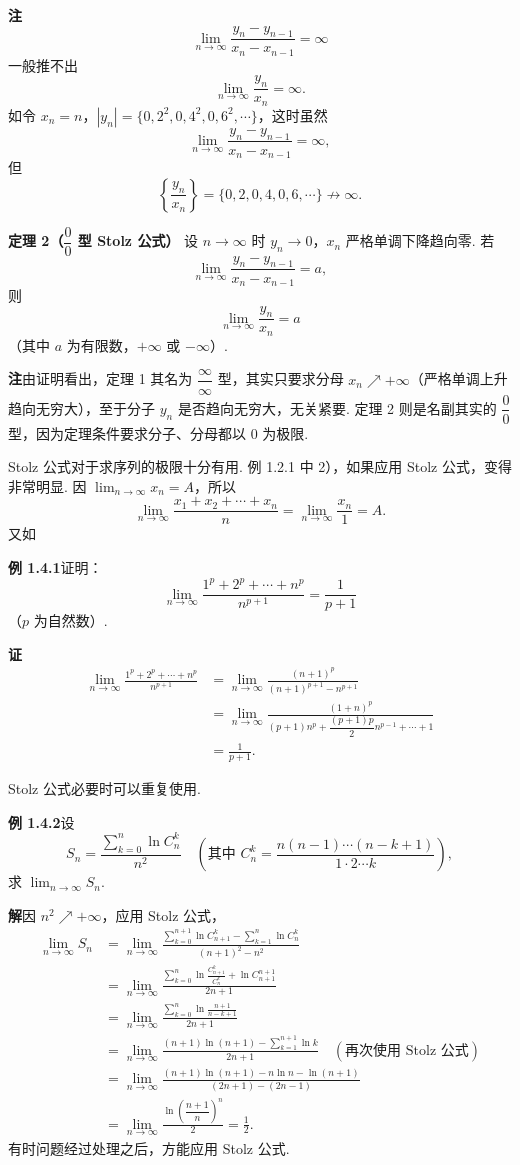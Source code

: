 \documentclass[UTF8,12pt,a4paper,fontset=fandol]{ctexart}
\begin{document}
\noindent\textbf{注}\quad
\[
  \lim_{n\to\infty}\frac{y_n-y_{n-1}}{x_n-x_{n-1}}=\infty
\]
一般推不出
\[
  \lim_{n\to\infty}\frac{y_n}{x_n}=\infty.
\]
如令 $x_n=n$，$|y_n|=\{0,2^2,0,4^2,0,6^2,\cdots\}$，这时虽然
\[
  \lim_{n\to\infty}\frac{y_n-y_{n-1}}{x_n-x_{n-1}}=\infty,
\]
但
\[
  \left\{\frac{y_n}{x_n}\right\}=\{0,2,0,4,0,6,\cdots\}\not\to\infty.
\]

\noindent\textbf{定理 2（$\dfrac00$ 型 Stolz 公式）}\quad
设 $n\to\infty$ 时 $y_n\to0$，$x_n$ 严格单调下降趋向零.
若
\[
  \lim_{n\to\infty}\frac{y_n-y_{n-1}}{x_n-x_{n-1}}=a,
\]
则
\[
  \lim_{n\to\infty}\frac{y_n}{x_n}=a
\]
（其中 $a$ 为有限数，$+\infty$ 或 $-\infty$）.

\noindent\textbf{注}\quad 由证明看出，定理 1 其名为 $\dfrac\infty\infty$ 型，其实只要求分母 $x_n\nearrow+\infty$（严格单调上升趋向无穷大），至于分子 $y_n$ 是否趋向无穷大，无关紧要. 定理 2 则是名副其实的 $\dfrac00$ 型，因为定理条件要求分子、分母都以 0 为极限.

Stolz 公式对于求序列的极限十分有用. 例 1.2.1 中 2），如果应用 Stolz 公式，变得非常明显. 因 $\displaystyle\lim_{n\to\infty}x_n=A$，所以
\[
  \lim_{n\to\infty}\frac{x_1+x_2+\cdots+x_n}{n}
  =\lim_{n\to\infty}\frac{x_n}{1}=A.
\]
又如

\noindent\textbf{例 1.4.1}\quad 证明：
\[
  \lim_{n\to\infty}\frac{1^p+2^p+\cdots+n^p}{n^{p+1}}
  =\frac1{p+1}
\]
（$p$ 为自然数）.

\noindent\textbf{证}\quad
\[
\begin{aligned}
  \lim_{n\to\infty}\frac{1^p+2^p+\cdots+n^p}{n^{p+1}}
  &=\lim_{n\to\infty}\frac{(n+1)^p}{(n+1)^{p+1}-n^{p+1}}\\
  &=\lim_{n\to\infty}
  \frac{(1+n)^p}{(p+1)n^p+\dfrac{(p+1)p}{2}n^{p-1}+\cdots+1}\\
  &=\frac1{p+1}.
\end{aligned}
\]

Stolz 公式必要时可以重复使用.

\noindent\textbf{例 1.4.2}\quad 设
\[
  S_n=\frac{\displaystyle\sum_{k=0}^n\ln C_n^k}{n^2}
  \quad\left(\text{其中 }C_n^k=\frac{n(n-1)\cdots(n-k+1)}{1\cdot2\cdots k}\right),
\]
求 $\displaystyle\lim_{n\to\infty}S_n$.

\noindent\textbf{解}\quad 因 $n^2\nearrow+\infty$，应用 Stolz 公式，
\[
\begin{aligned}
  \lim_{n\to\infty}S_n
  &=\lim_{n\to\infty}
  \frac{\displaystyle\sum_{k=0}^{n+1}\ln C_{n+1}^k-\sum_{k=1}^n\ln C_n^k}{(n+1)^2-n^2}\\
  &=\lim_{n\to\infty}
  \frac{\displaystyle\sum_{k=0}^n\ln\frac{C_{n+1}^k}{C_n^k}+\ln C_{n+1}^{n+1}}{2n+1}\\
  &=\lim_{n\to\infty}
  \frac{\displaystyle\sum_{k=0}^n\ln\frac{n+1}{n-k+1}}{2n+1}\\
  &=\lim_{n\to\infty}
  \frac{(n+1)\ln(n+1)-\displaystyle\sum_{k=1}^{n+1}\ln k}{2n+1}
  \quad(\text{再次使用 Stolz 公式})\\
  &=\lim_{n\to\infty}
  \frac{(n+1)\ln(n+1)-n\ln n-\ln(n+1)}
  {(2n+1)-(2n-1)}\\
  &=\lim_{n\to\infty}
  \frac{\ln\left(\dfrac{n+1}{n}\right)^n}{2}
  =\frac12.
\end{aligned}
\]
有时问题经过处理之后，方能应用 Stolz 公式.
\end{document}
